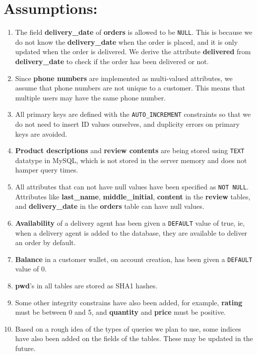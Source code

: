\documentclass[12pt]{report}
\begin{document}
    \section*{Assumptions:}
    \begin{enumerate}
        \item
        The field \textbf{delivery\_date} of \textbf{orders} is allowed to be \texttt{NULL}.
        This is because we do not know the \textbf{delivery\_date} when the order is placed, and it is only updated when the order is delivered.
        We derive the attribute \textbf{delivered} from \textbf{delivery\_date} to check if the order has been delivered or not.
        \item
        Since \textbf{phone numbers} are implemented as multi-valued attributes, we assume that phone numbers are not unique to a customer.
        This means that multiple users may have the same phone number.
        \item
        All primary keys are defined with the \texttt{AUTO\_INCREMENT} constraints so that we do not need to insert ID values ourselves,
        and duplicity errors on primary keys are avoided.
        \item
        \textbf{Product descriptions} and \textbf{review contents} are being stored using \texttt{TEXT} datatype in MySQL, which is not stored
        in the server memory and does not hamper query times.
        \item
        All attributes that can not have null values have been specified as \texttt{NOT NULL}. Attributes like \textbf{last\_name}, \textbf{middle\_initial},
        \textbf{content} in the \textbf{review} tables, and \textbf{delivery\_date} in the \textbf{orders} table can have null values.
        \item
        \textbf{Availability} of a delivery agent has been given a \texttt{DEFAULT} value of true, ie, when a delivery agent is added to the database,
        they are available to deliver an order by default.
        \item
        \textbf{Balance} in a customer wallet, on account creation, has been given a \texttt{DEFAULT} value of 0.
        \item
        \textbf{pwd}'s in all tables are stored as SHA1 hashes.
        \item
        Some other integrity constrains have also been added, for example, \textbf{rating} must be between 0 and 5, and \textbf{quantity}
        and \textbf{price} must be positive.
        \item
        Based on a rough idea of the types of queries we plan to use, some indices have also been added on the fields of the tables.
        These may be updated in the future.
    \end{enumerate}
\end{document}
